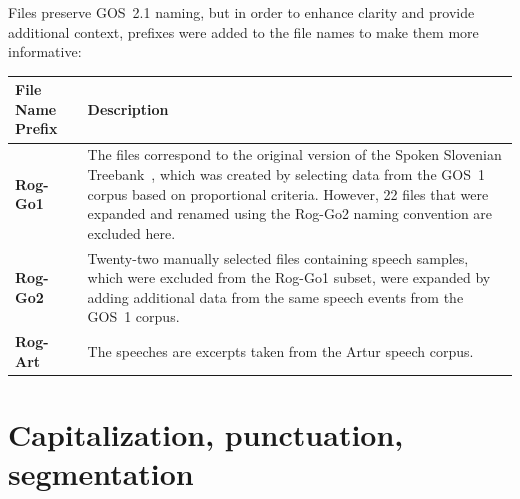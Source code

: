 \documentclass[a4paper,oneside,12pt]{article}
\begin{document}
\begin{samepage}

  Files preserve GOS~2.1 naming, but in order to enhance clarity and provide
  additional context, prefixes were added to the file names to make them more
  informative:

  \begin{center}
    \begin{tabular}{|l|p{10cm}|}
      \hline
      \textbf{File Name Prefix} & \textbf{Description}
      \\ \hline
      \textbf{Rog-Go1}          & The files correspond to the original version
      of the Spoken Slovenian Treebank~\cite{dobrovoljcandnivre}, which was
      created by selecting data from the GOS~1 corpus based on proportional
      criteria. However, 22 files that were expanded and renamed using the
      Rog-Go2 naming convention are excluded here.
      \\ \hline
      \textbf{Rog-Go2}          & Twenty-two manually selected files containing
      speech samples, which were excluded from the Rog-Go1 subset, were expanded
      by adding additional data from the same speech events from the GOS~1
      corpus.                                                                    \\ \hline
      \textbf{Rog-Art}          & The speeches are excerpts taken from the Artur
      speech corpus.
      \\ \hline
    \end{tabular}
  \end{center}
\end{samepage}

\section{Capitalization, punctuation, segmentation}
\end{document}
